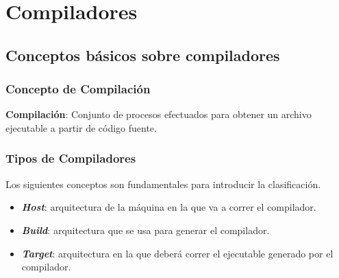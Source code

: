 \chapter{Compiladores}



\section{Conceptos básicos sobre compiladores}



\subsection{Concepto de Compilación}

    \textbf{Compilación}: Conjunto de procesos efectuados para obtener un archivo ejecutable
    a partir de código fuente. \cite{von_hagen_definitive_2006}


\subsection{Tipos de Compiladores}

    Los siguientes conceptos son fundamentales para introducir la clasificación.
    \begin{itemize}
        \item \textbf{\emph{Host}}: arquitectura de la máquina en la que va a correr el compilador.
        \item \textbf{\emph{Build}}: arquitectura que se usa para generar el compilador.
        \item \textbf{\emph{Target}}: arquitectura en la que deberá correr el ejecutable generado por el
        compilador. 
    \end{itemize}
    
